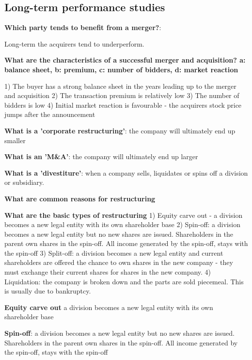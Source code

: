 \documentclass[12pt]{article}
\begin{document}
\begin{framed}
			\begin{framed}
				\section{Long-term performance studies}
				
				\textbf{Which party tends to benefit from a merger?}: 
				
				Long-term the acquirers tend to underperform.
				
				\textbf{What are the characteristics of a successful merger and acquisition? a: balance sheet, b: premium, c: number of bidders, d: market reaction}
				
				1) The buyer has a strong balance sheet in the years leading up to the merger and acquisition
				2) The transaction premium is relatively low
				3) The number of bidders is low
				4) Initial market reaction is favourable - the acquirers stock price jumps after the announcement
				
				
			\end{framed}
			
			\textbf{What is a 'corporate restructuring'}: the company will ultimately end up smaller
			
			\textbf{What is an 'M\&A'}: the company will ultimately end up larger
			
			\textbf{What is a 'divestiture'}: when a company sells, liquidates or spins off a division or subsidiary.
			
			\textbf{What are common reasons for restructuring}
			
			\textbf{What are the basic types of restructuring}
			1) Equity carve out - a division becomes a new legal entity with its own shareholder base
			2) Spin-off: a division becomes a new legal entity but no new shares are issued. Shareholders in the parent own shares in the spin-off. All income generated by the spin-off, stays with the spin-off
			3) Split-off: a division becomes a new legal entity and current shareholders are offered the chance to own shares in the new company - they must exchange their current shares for shares in the new company.
			4) Liquidation: the company is broken down and the parts are sold piecemeal. This is usually due to bankruptcy.
			
			\textbf{Equity carve out} a division becomes a new legal entity with its own shareholder base
			
			\textbf{Spin-off}: a division becomes a new legal entity but no new shares are issued. Shareholders in the parent own shares in the spin-off. All income generated by the spin-off, stays with the spin-off
			

\end{framed}
\end{document}
